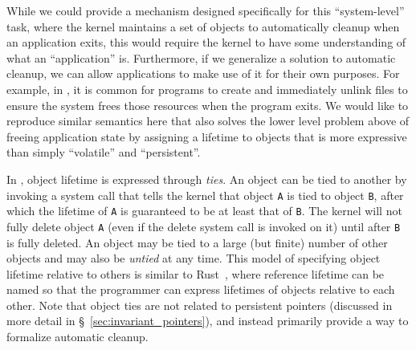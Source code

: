 {    While we could provide a mechanism designed specifically for this ``system-level'' task,
    where the kernel maintains a set of objects to automatically cleanup when an application exits, this
    would require the kernel to have some understanding of what an ``application'' is. Furthermore, if
    we generalize a solution to automatic cleanup, we can allow applications to make use of it for their
    own purposes. For example, in \unix, it is common for programs to create and immediately unlink
    files to ensure the system frees those resources when the program exits. We would like to reproduce
    similar semantics here that also solves the lower level problem above of freeing application state
    by assigning a lifetime to objects that is more expressive than simply ``volatile'' and
    ``persistent''.

    In \Twizzler, object lifetime is expressed through \emph{ties}.
    An object can be tied to another by invoking a system call that tells the kernel that
    object \texttt{A} is tied to object \texttt{B}, after which the lifetime of \texttt{A} is
    guaranteed to be at least that of \texttt{B}. The kernel will not fully delete object \texttt{A} (even if the
    delete system call is invoked on it) until after \texttt{B} is fully deleted. An object may be tied
    to a large (but finite) number of other objects and may also be \emph{untied} at any time. This
    model of specifying object lifetime relative to others is similar to Rust~\cite{rust}, where
    reference lifetime can be named so that the programmer can express lifetimes of objects relative to
    each other. Note that object ties are not related to persistent pointers (discussed in more detail
    in \S~\ref{sec:invariant_pointers}), and instead primarily provide a way to formalize automatic cleanup.


}

